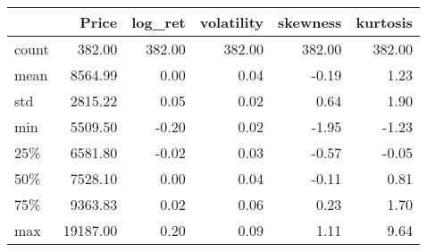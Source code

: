 \begin{tabular}{lrrrrr}
\toprule
{} &    Price &  log\_ret &  volatility &  skewness &  kurtosis \\
\midrule
count &   382.00 &   382.00 &      382.00 &    382.00 &    382.00 \\
mean  &  8564.99 &     0.00 &        0.04 &     -0.19 &      1.23 \\
std   &  2815.22 &     0.05 &        0.02 &      0.64 &      1.90 \\
min   &  5509.50 &    -0.20 &        0.02 &     -1.95 &     -1.23 \\
25\%   &  6581.80 &    -0.02 &        0.03 &     -0.57 &     -0.05 \\
50\%   &  7528.10 &     0.00 &        0.04 &     -0.11 &      0.81 \\
75\%   &  9363.83 &     0.02 &        0.06 &      0.23 &      1.70 \\
max   & 19187.00 &     0.20 &        0.09 &      1.11 &      9.64 \\
\bottomrule
\end{tabular}
